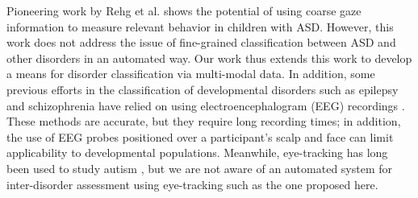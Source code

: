\documentclass{llncs}
\begin{document}
  Pioneering work by Rehg et al. \cite{RAG33} shows the potential of using coarse gaze information to measure relevant behavior in children with ASD.
  However, this work does not address the issue of fine-grained classification between ASD and other disorders in an automated way. Our work thus extends this work to develop a means for disorder classification via multi-modal data.
  In addition, some previous efforts in the classification of developmental disorders such as epilepsy and schizophrenia have relied on using electroencephalogram (EEG) recordings \cite{Kumar}. These methods are accurate, but they require  long recording times; in addition, the use of EEG probes positioned over a participant's scalp and face can limit applicability to developmental populations. Meanwhile, eye-tracking has long been used to study autism \cite{Boraston,hashemi}, but we are not aware of an automated system for inter-disorder assessment using eye-tracking such as the one proposed here.
\end{document}

